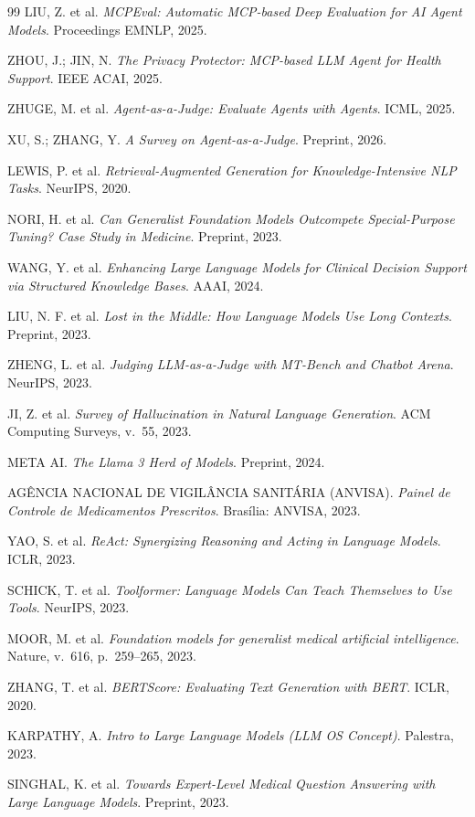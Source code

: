 \documentclass[12pt]{article}
\begin{document}
\begin{thebibliography}{99}
LIU, Z. et al. \textit{MCPEval: Automatic MCP-based Deep Evaluation for AI Agent Models}. Proceedings EMNLP, 2025.

ZHOU, J.; JIN, N. \textit{The Privacy Protector: MCP-based LLM Agent for Health Support}. IEEE ACAI, 2025.

ZHUGE, M. et al. \textit{Agent-as-a-Judge: Evaluate Agents with Agents}. ICML, 2025.

XU, S.; ZHANG, Y. \textit{A Survey on Agent-as-a-Judge}. Preprint, 2026.

LEWIS, P. et al. \textit{Retrieval-Augmented Generation for Knowledge-Intensive NLP Tasks}. NeurIPS, 2020.

NORI, H. et al. \textit{Can Generalist Foundation Models Outcompete Special-Purpose Tuning? Case Study in Medicine}. Preprint, 2023.

WANG, Y. et al. \textit{Enhancing Large Language Models for Clinical Decision Support via Structured Knowledge Bases}. AAAI, 2024.

LIU, N. F. et al. \textit{Lost in the Middle: How Language Models Use Long Contexts}. Preprint, 2023.

ZHENG, L. et al. \textit{Judging LLM-as-a-Judge with MT-Bench and Chatbot Arena}. NeurIPS, 2023.

JI, Z. et al. \textit{Survey of Hallucination in Natural Language Generation}. ACM Computing Surveys, v.~55, 2023.

META AI. \textit{The Llama 3 Herd of Models}. Preprint, 2024.

AGÊNCIA NACIONAL DE VIGILÂNCIA SANITÁRIA (ANVISA). \textit{Painel de Controle de Medicamentos Prescritos}. Brasília: ANVISA, 2023.

YAO, S. et al. \textit{ReAct: Synergizing Reasoning and Acting in Language Models}. ICLR, 2023.

SCHICK, T. et al. \textit{Toolformer: Language Models Can Teach Themselves to Use Tools}. NeurIPS, 2023.

MOOR, M. et al. \textit{Foundation models for generalist medical artificial intelligence}. Nature, v.~616, p.~259--265, 2023.

ZHANG, T. et al. \textit{BERTScore: Evaluating Text Generation with BERT}. ICLR, 2020.

KARPATHY, A. \textit{Intro to Large Language Models (LLM OS Concept)}. Palestra, 2023.

SINGHAL, K. et al. \textit{Towards Expert-Level Medical Question Answering with Large Language Models}. Preprint, 2023.

\end{thebibliography}
\end{document}

